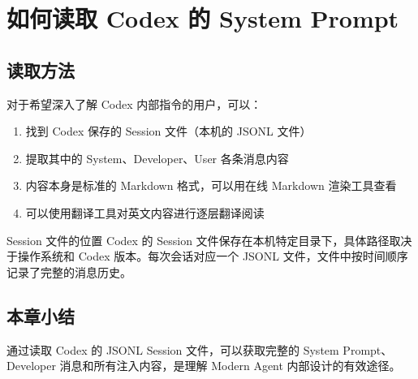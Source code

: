 \section{如何读取 Codex 的 System Prompt}

\subsection{读取方法}

对于希望深入了解 Codex 内部指令的用户，可以：

\begin{enumerate}
    \item 找到 Codex 保存的 Session 文件（本机的 JSONL 文件）
    \item 提取其中的 System、Developer、User 各条消息内容
    \item 内容本身是标准的 Markdown 格式，可以用在线 Markdown 渲染工具查看
    \item 可以使用翻译工具对英文内容进行逐层翻译阅读
\end{enumerate}

\begin{warningbox}{Session 文件的位置}
Codex 的 Session 文件保存在本机特定目录下，具体路径取决于操作系统和 Codex 版本。每次会话对应一个 JSONL 文件，文件中按时间顺序记录了完整的消息历史。
\end{warningbox}

\subsection{本章小结}

通过读取 Codex 的 JSONL Session 文件，可以获取完整的 System Prompt、Developer 消息和所有注入内容，是理解 Modern Agent 内部设计的有效途径。


